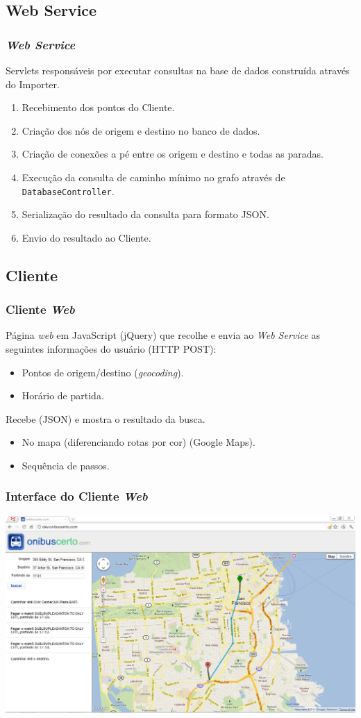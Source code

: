 \subsection{Web Service}
\frame
{
\frametitle{\emph{Web Service}}
Servlets responsáveis por executar consultas na base de dados construída através do Importer.

\begin{enumerate}
\item Recebimento dos pontos do Cliente.
\item Criação dos nós de origem e destino no banco de dados.
\item Criação de conexões a pé entre os origem e destino e todas as paradas.
\item Execução da consulta de caminho mínimo no grafo através de \texttt{DatabaseController}.
\item Serialização do resultado da consulta para formato JSON.
\item Envio do resultado ao Cliente.
\end{enumerate}
}

\subsection{Cliente}
\frame
{
\frametitle{Cliente \emph{Web}}
Página \emph{web} em JavaScript (jQuery) que recolhe e envia ao \emph{Web Service} as seguintes informações do usuário (HTTP POST):
\begin{itemize}
\item Pontos de origem/destino (\emph{geocoding}).
\item Horário de partida.
\end{itemize}
Recebe (JSON) e mostra o resultado da busca.
\begin{itemize}
\item No mapa (diferenciando rotas por cor) (Google Maps).
\item Sequência de passos.
\end{itemize}
}

\frame
{
\frametitle{Interface do Cliente \emph{Web}}
\includegraphics[width=1\textwidth]{./imgs/clienteweb.png}

}